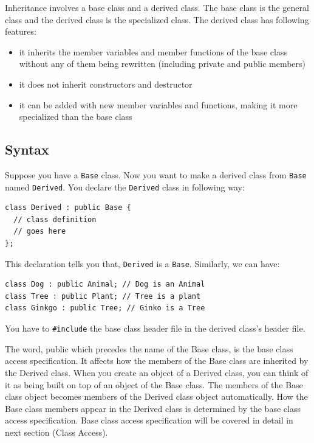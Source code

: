 \documentclass[12pt]{book}
\begin{document}
Inheritance involves a base class and a derived class. The base class is the general class and the derived class is the specialized class. The derived class has following features:
\begin{itemize}
\item it inherits the member variables and member functions of the base class without any of them being rewritten (including private and public members)
\item it does not inherit constructors and destructor
\item it can be added with new member variables and functions, making it more specialized than the base class
\end{itemize}

\subsection{Syntax}
\label{sec:orgb6931b7}
Suppose you have a \texttt{Base} class. Now you want to make a derived class from \texttt{Base} named \texttt{Derived}. You declare the \texttt{Derived} class in following way:
\begin{verbatim}
class Derived : public Base {
  // class definition
  // goes here
};
\end{verbatim}

This declaration tells you that, \texttt{Derived} is a \texttt{Base}. Similarly, we can have:
\begin{verbatim}
class Dog : public Animal; // Dog is an Animal
class Tree : public Plant; // Tree is a plant
class Ginkgo : public Tree; // Ginko is a Tree
\end{verbatim}

You have to \texttt{\#include} the base class header file in the derived class's header file.

The word, public which precedes the name of the Base class, is the base class access specification. It affects how the members of the Base class are inherited by the Derived class. When you create an object of a Derived class, you can think of it as being built on top of an object of the Base class. The members of the Base class object becomes members of the Derived class object automatically. How the Base class members appear in the Derived class is determined by the base class access specification. Base class access specification will be covered in detail in next section (Class Access).
\end{document}
